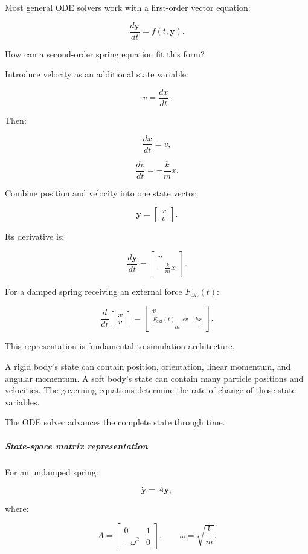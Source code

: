 Most general ODE solvers work with a first-order vector equation:

\[
\boxed{ \frac{d\mathbf y}{dt}=f(t,\mathbf y) }.
\]

How can a second-order spring equation fit this form?

Introduce velocity as an additional state variable:

\[
v=\frac{dx}{dt}.
\]

Then:

\[
\frac{dx}{dt}=v,
\]

\[
\frac{dv}{dt}=-\frac{k}{m}x.
\]

Combine position and velocity into one state vector:

\[
\mathbf y= \begin{bmatrix} x\\v \end{bmatrix}.
\]

Its derivative is:

\[
\boxed{ \frac{d\mathbf y}{dt} = \begin{bmatrix} v\\ -\frac{k}{m}x \end{bmatrix} }.
\]

For a damped spring receiving an external force \(F_{\mathrm{ext}}(t)\):

\[
\boxed{ \frac{d}{dt} \begin{bmatrix} x\\v \end{bmatrix} = \begin{bmatrix} v\\ \frac{F_{\mathrm{ext}}(t)-cv-kx}{m} \end{bmatrix} }.
\]

This representation is fundamental to simulation architecture.

A rigid body's state can contain position, orientation, linear momentum, and angular momentum. A soft body's state can contain many particle positions and velocities. The governing equations determine the rate of change of those state variables.

The ODE solver advances the complete state through time.

\subparagraph{State-space matrix representation}\label{state-space-matrix-representation}

For an undamped spring:

\[
\dot{\mathbf y}=A\mathbf y,
\]

where:

\[
\boxed{ A= \begin{bmatrix} 0&1\\ -\omega^2&0 \end{bmatrix}, \qquad \omega=\sqrt{\frac{k}{m}} }.
\]

